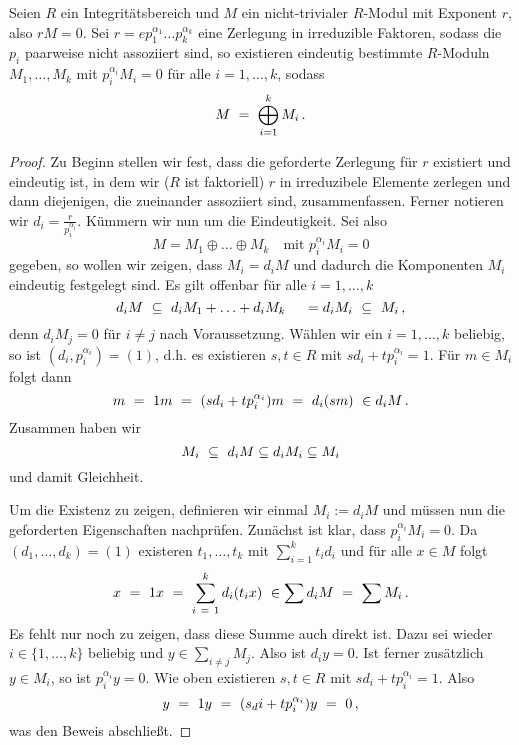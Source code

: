 \begin{satz}
  Seien $R$ ein Integritätsbereich und 
  $M$ ein nicht-trivialer $R$-Modul mit Exponent $r$, also $rM = 0$.
  Sei $r = e p_1^{\alpha_1}\ldots p_k^{\alpha_k}$ eine Zerlegung in irreduzible
  Faktoren, sodass die $p_i$ paarweise nicht assoziiert sind, 
  so existieren eindeutig bestimmte $R$-Moduln 
  $M_1,\ldots,M_k$ mit $p_i^{\alpha_i}M_i = 0$ für alle $i=1,\ldots,k$, sodass
  \[ M \ =\  \bigoplus_{i=1}^k M_i\,.\]
\end{satz}
\begin{proof}
  Zu Beginn stellen wir fest, dass die geforderte Zerlegung für $r$ existiert
  und eindeutig ist, in dem wir ($R$ ist faktoriell) $r$ in irreduzibele
  Elemente zerlegen und dann diejenigen, die zueinander assoziiert sind,
  zusammenfassen. Ferner notieren wir $d_i = \frac{r}{p_i^{\alpha_i}}$.
  Kümmern wir nun um die Eindeutigkeit. Sei also 
  \[ M = M_1 \oplus \ldots \oplus M_k \quad\text{mit } p_i^{\alpha_i} M_i = 0\]
  gegeben, so wollen wir zeigen, dass $M_i = d_i M$ und dadurch die Komponenten
  $M_i$ eindeutig festgelegt sind. Es gilt offenbar für alle $i=1,\ldots,k$
  \[ d_i M \ \subseteq\  d_i M_1 + \ldots + d_i M_k \ \ \ \ = d_i M_i 
    \ \subseteq\  M_i\,,\]
  denn $d_i M_j = 0$ für $i\neq j$ nach Voraussetzung. 
  Wählen wir ein $i = 1,\ldots,k$ beliebig, so ist 
  $(d_i, p_i^{\alpha_i}) = (1)$, d.h. es existieren $s,t \in R$ mit
  $sd_i + t p_i^{\alpha_i} = 1$. Für $m\in M_i$ folgt dann
  \[ m \speq= 1m \speq= (sd_i + tp_i^{\alpha_i})m \speq= d_i (sm)\ 
    \in d_i M\,. \]
  Zusammen haben wir 
  \[ M_i \ \subseteq\  d_iM \subseteq d_iM_i \subseteq M_i\]
  und damit Gleichheit.

  Um die Existenz zu zeigen, definieren wir einmal $M_i := d_iM$ und müssen nun
  die geforderten Eigenschaften nachprüfen. Zunächst ist klar, dass
  $p_i^{\alpha_i}M_i = 0$. Da $(d_1,\ldots,d_k) = (1)$ existeren 
  $t_1,\ldots,t_k$ mit $\sum_{i=1}^kt_id_i$ und für alle $x \in M$ folgt
  \[ x \ =\  1x \ =\  \sum_{i\ =\ 1}^k d_i(t_ix) 
    \ \in \sum d_iM \ =\  \sum M_i\,.\]
  Es fehlt nur noch zu zeigen, dass diese Summe auch direkt ist. 
  Dazu sei wieder $i\in\{1,\ldots,k\}$ beliebig und 
  $y \in \sum_{i\neq j} M_j$. Also ist $d_iy = 0$. Ist ferner zusätzlich
  $y \in M_i$, so ist $p_i^{\alpha_i}y = 0$. Wie oben existieren $s,t \in R$
  mit $sd_i + tp_i^{\alpha_i} = 1$. Also
  \[ y \ =\  1y \ =\  (s_di + tp_i^{\alpha_i})y \ =\  0\,,\]
  was den Beweis abschließt.
\end{proof}


